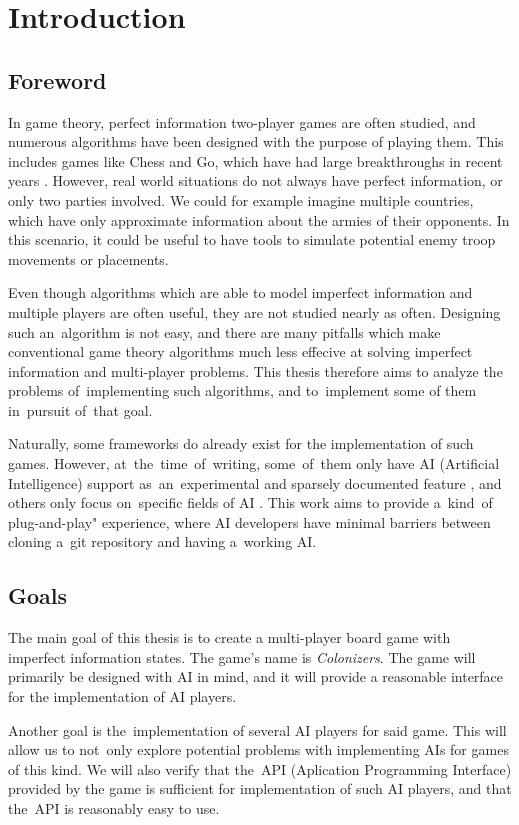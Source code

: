 \chapter*{Introduction}

\section*{Foreword}

In game theory, perfect information two-player games are often
studied, and numerous algorithms have been designed with the purpose
of playing them. This includes games like Chess and Go, which have had
large breakthroughs in recent years \cite{Silver16}. However, real world
situations do not always have perfect information, or only two parties involved.
We could for example imagine multiple countries, which have only approximate
information about the armies of their opponents. In this scenario, it could be
useful to have tools to simulate potential enemy troop movements or placements.

Even though algorithms which are able to model imperfect information and multiple
players are often useful, they are not studied nearly as often. Designing such
an~algorithm is not easy, and there are many pitfalls which make conventional
game theory algorithms much less effecive at solving imperfect information and
multi-player problems. This thesis therefore aims to analyze the problems
of~implementing such algorithms, and to~implement some of them in~pursuit of~that goal.

Naturally, some frameworks do already exist for the implementation of such games.
However, at~the~time~of~writing, some~of~them only have AI (Artificial Intelligence)
support as~an~experimental and sparsely documented feature \cite{Boardgameio},
and others only focus on~specific fields of AI \cite{Openaigym}. This work aims to provide 
a~kind~of plug-and-play" experience, where AI developers have minimal barriers between
cloning a~git repository and having a~working AI.

\section*{Goals}

The main goal of this thesis is to create a multi-player board game with
imperfect information states. The game's name is \emph{Colonizers}. The game will primarily be designed with AI
in mind, and it will provide a reasonable interface for
the implementation of AI players.

Another goal is the~implementation of several AI players for said game. This will
allow us to not~only explore potential problems with implementing AIs for games
of this kind. We will also verify that the~API (Aplication Programming Interface)
provided by the game is sufficient for implementation of such AI players, and that
the~API is reasonably easy to use.

